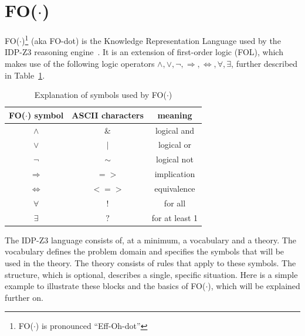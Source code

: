 \documentclass[11pt,a4paper]{report}
\newcommand{\fodot}{FO($\cdot$)\xspace}
\begin{document}
\section{\fodot}
\label{fodot}
\fodot \footnote{\fodot is pronounced ``Eff-Oh-dot''} (aka FO-dot) is the Knowledge Representation Language used by the IDP-Z3 reasoning engine~\cite{IDPZ3ReasoningEngine}. It is an extension of first-order logic (FOL), which makes use of the following logic operators $\land, \lor, \neg, \Rightarrow, \Leftrightarrow, \forall, \exists$, further described in Table~\ref{tab:fodot_symbols}.

\begin{table}
    \centering
    \caption{Explanation of symbols used by \fodot}
    \label{tab:fodot_symbols}
    \begin{tabular}{|c|c|c|}
    \hline
    \fodot symbol & ASCII characters & meaning \\ \hline
    $\land$  & $\&$ & logical and   \\ \hline
    $\lor$   & $\mid$ & logical or   \\ \hline
    $\neg$   & $\sim$ & logical not   \\ \hline
    $\Rightarrow$ & $=>$ & implication   \\ \hline
    $\Leftrightarrow$ & $<=>$ & equivalence   \\ \hline
    $\forall$ & $!$ & for all   \\ \hline
    $\exists$   & $?$ & for at least 1   \\ \hline
    \end{tabular}
\end{table}


The IDP-Z3 language consists of, at a minimum, a vocabulary and a theory. The vocabulary defines the problem domain and specifies the symbols that will be used in the theory. The theory consists of rules that apply to these symbols. The structure, which is optional, describes a single, specific situation. Here is a simple example to illustrate these blocks and the basics of \fodot, which will be explained further on.
\end{document}
